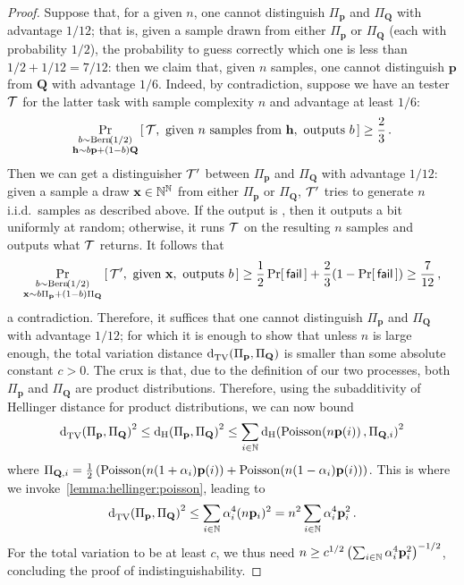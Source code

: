 \documentclass[10pt]{article}
\newcommand{\p}{\mathbf{p}}
\newcommand{\bigq}{\mathbf{Q}}
\newcommand{\ns}{n}
\begin{document}
\begin{proof}
Suppose that, for a given $\ns$, one cannot distinguish $\Pi_\p$ and $\Pi_{\bigq}$ with advantage $1/12$; that is, given a sample drawn from either $\Pi_\p$ or $\Pi_{\bigq}$ (each with probability $1/2$), the probability to guess correctly which one is less than $1/2+1/12=7/12$: then we claim that, given $\ns$ samples, one cannot distinguish $\p$ from $\bigq$ with advantage $1/6$. Indeed, by contradiction, suppose we have an tester $\mathcal{T}$ for the latter task with sample complexity $\ns$ and advantage at least $1/6$:
\begin{equation}
      \probaDistrOf{ \substack{b\sim\bernoulli{1/2}\\ \mathbf{h}\sim b\p+(1-b)\bigq } }{ \Tester, \text{ given }\ns\text{ samples from }\mathbf{h},\text{ outputs } b } \geq \frac{2}{3}\,.
\end{equation}
Then we can get a distinguisher $\mathcal{T}'$ between $\Pi_\p$ and $\Pi_{\bigq}$ with advantage $1/12$: given a sample a draw $\mathbf{x}\in\mathbb{N}^{\mathbb{N}}$ from either $\Pi_\p$ or $\Pi_{\bigq}$, $\mathcal{T}'$ tries to generate $\ns$ i.i.d.\ samples as described above. If the output is \fail, then it outputs a bit uniformly at random; otherwise, it runs $\mathcal{T}$ on the resulting $\ns$ samples and outputs what $\mathcal{T}$ returns. It follows that
\begin{equation}
      \probaDistrOf{ \substack{b\sim\bernoulli{1/2}\\ \mathbf{x}\sim b\Pi_\p+(1-b)\Pi_\bigq } }{ \Tester', \text{ given } \mathbf{x},\text{ outputs } b }
      \geq \frac{1}{2}\probaOf{\fail} + \frac{2}{3}(1-\probaOf{\fail})      
       \geq \frac{7}{12}\,,
\end{equation}
a contradiction. Therefore, it suffices that one cannot distinguish $\Pi_\p$ and $\Pi_{\bigq}$ with advantage $1/12$; for which it is enough to show that unless $\ns$ is large enough, the total variation distance $\totalvardist{\Pi_\p}{\Pi_{\bigq}}$ is smaller than some absolute constant $c>0$. The crux is that, due to the definition of our two processes, both $\Pi_\p$ and $\Pi_{\bigq}$ are product distributions. Therefore, using the subadditivity of Hellinger distance for product distributions, we can now bound
\begin{equation}
      \totalvardist{\Pi_\p}{\Pi_{\bigq}}^2 \leq \hellinger{\Pi_\p}{\Pi_{\bigq}}^2 \leq \sum_{i\in\N}\hellinger{ \poisson{\ns\p(i)} }{ \Pi_{\bigq,i} }^2
\end{equation}
where $\Pi_{\bigq,i} = \frac{1}{2}\left( \poisson{\ns(1+\alpha_i)\p(i)}+\poisson{\ns(1-\alpha_i)\p(i)} \right)$. This is where we invoke~\autoref{lemma:hellinger:poisson}, leading to
\begin{equation}
      \totalvardist{\Pi_\p}{\Pi_{\bigq}}^2 \leq \sum_{i\in\N} \alpha_i^4 (\ns\p_i)^2 = \ns^2 \sum_{i\in\N} \alpha_i^4\p_i^2\,.
\end{equation}
For the total variation to be at least $c$, we thus need $\ns \geq c^{1/2}\left(\sum_{i\in\N} \alpha_i^4\p_i^2\right)^{-1/2}$, concluding the proof of indistinguishability.\smallskip


\end{proof}
\end{document}

